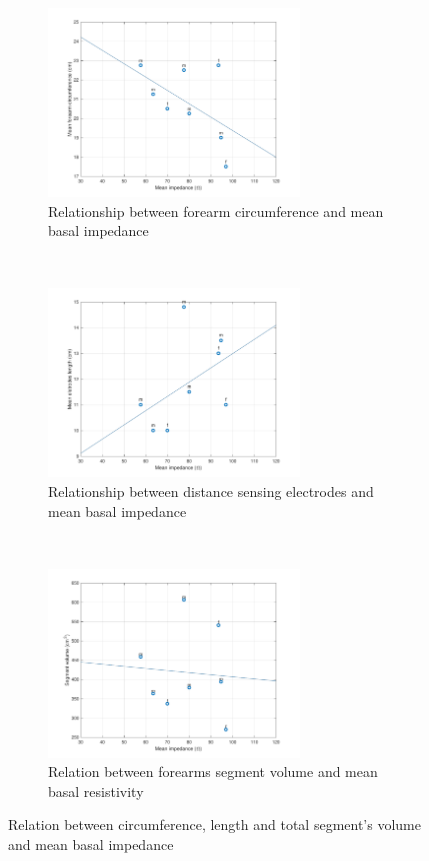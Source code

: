 \begin{figure}[!htbp]
	\centering
	\begin{subfigure}[t]{0.48\textwidth}
		\centering
		\includegraphics[height=5cm]{figure2a}
		\caption{Relationship between forearm circumference and mean basal impedance}
		\label{fig:C_vs_Z}
	\end{subfigure}%
	~ 
	\begin{subfigure}[t]{0.48\textwidth}
		\centering
		\includegraphics[height=5cm]{figure2b}
		\caption{Relationship between distance sensing electrodes and mean basal impedance}
		\label{fig:l_vs_Z}
	\end{subfigure}
	~ 
	\begin{subfigure}[t]{0.48\textwidth}
		\centering
		\includegraphics[height=5cm]{figure2c}
		\caption{Relation between forearms segment volume and mean basal resistivity}
		\label{fig:Ve_vs_Z}
	\end{subfigure}
	\caption{Relation between circumference, length and total segment's volume and mean basal impedance}
	\label{fig:relation_geometry_vs_impedance}
\end{figure}


